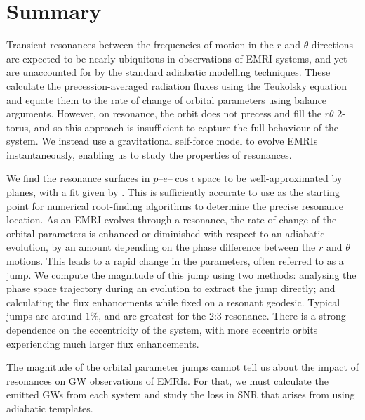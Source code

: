 \section{Summary}
Transient resonances between the frequencies of motion in the $r$ and $\theta$ directions are expected to be nearly ubiquitous in observations of EMRI systems, and yet are unaccounted for by the standard adiabatic modelling techniques. These calculate the precession-averaged radiation fluxes using the Teukolsky equation and equate them to the rate of change of orbital parameters using balance arguments. However, on resonance, the orbit does not precess and fill the $r\theta$ 2-torus, and so this approach is insufficient to capture the full behaviour of the system. We instead use a gravitational self-force model to evolve EMRIs instantaneously, enabling us to study the properties of resonances.

We find the resonance surfaces in $p$--$e$--$\cos\iota$ space to be well-approximated by planes, with a fit given by . This is sufficiently accurate to use as the starting point for numerical root-finding algorithms to determine the precise resonance location. As an EMRI evolves through a resonance, the rate of change of the orbital parameters is enhanced or diminished with respect to an adiabatic evolution, by an amount depending on the phase difference between the $r$ and $\theta$ motions. This leads to a rapid change in the parameters, often referred to as a jump. We compute the magnitude of this jump using two methods: analysing the phase space trajectory during an evolution to extract the jump directly; and calculating the flux enhancements while fixed on a resonant geodesic. Typical jumps are around $1\%$, and are greatest for the 2:3 resonance. There is a strong dependence on the eccentricity of the system, with more eccentric orbits experiencing much larger flux enhancements.

The magnitude of the orbital parameter jumps cannot tell us about the impact of resonances on GW observations of EMRIs. For that, we must calculate the emitted GWs from each system and study the loss in SNR that arises from using adiabatic templates.

